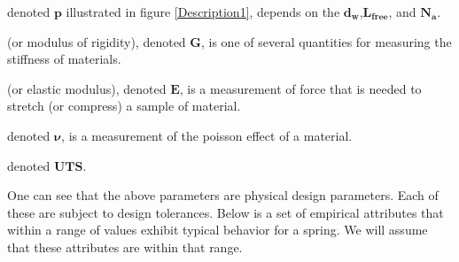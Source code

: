 \documentclass[10pt]{article}
\begin{document}
\begin{description}[leftmargin=!,labelwidth=\widthof{\bfseries Ultimate torsional stress:}]
			\item[Pitch:] denoted $\mathbf{p}$ illustrated in figure \ref{Description1}, depends on the $\mathbf{d_{w}}$,$\mathbf{L_{free}}$, and $\mathbf{N_{a}}$.			
			
			\item[Shear modulus:] (or modulus of rigidity), denoted $\mathbf{G}$, is one of several quantities for measuring the stiffness of materials.
			
			\item[Young's modulus:] (or elastic modulus), denoted $\mathbf{E}$, is a measurement of force that is needed  to stretch (or compress) a sample of material.
			
			\item[Poisson ratio:] denoted $\mathbf{\nu}$, is a measurement of the poisson effect of a material. 
			
			\item[Ultimate torsional stress:] denoted $\mathbf{UTS}$. 
		
		\end{description}

One can see that the above parameters are physical design parameters. Each of these are subject to design tolerances. Below is a set of empirical attributes that within a range of values exhibit typical behavior for a spring. We will assume that these attributes are within that range. 
\end{document}
